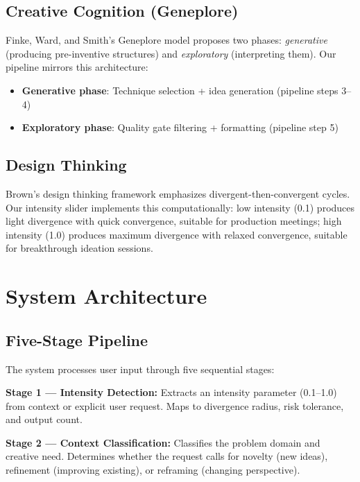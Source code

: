 \documentclass[11pt,a4paper]{article}
\begin{document}
\subsection{Creative Cognition (Geneplore)}

Finke, Ward, and Smith's \cite{finke1992creative} Geneplore model proposes two phases: \textit{generative} (producing pre-inventive structures) and \textit{exploratory} (interpreting them). Our pipeline mirrors this architecture:

\begin{itemize}
    \item \textbf{Generative phase}: Technique selection + idea generation (pipeline steps 3--4)
    \item \textbf{Exploratory phase}: Quality gate filtering + formatting (pipeline step 5)
\end{itemize}

\subsection{Design Thinking}

Brown's \cite{brown2008design} design thinking framework emphasizes divergent-then-convergent cycles. Our intensity slider implements this computationally: low intensity (0.1) produces light divergence with quick convergence, suitable for production meetings; high intensity (1.0) produces maximum divergence with relaxed convergence, suitable for breakthrough ideation sessions.

\section{System Architecture}

\subsection{Five-Stage Pipeline}

The system processes user input through five sequential stages:

\textbf{Stage 1 — Intensity Detection:} Extracts an intensity parameter (0.1--1.0) from context or explicit user request. Maps to divergence radius, risk tolerance, and output count.

\textbf{Stage 2 — Context Classification:} Classifies the problem domain and creative need. Determines whether the request calls for novelty (new ideas), refinement (improving existing), or reframing (changing perspective).
\end{document}
